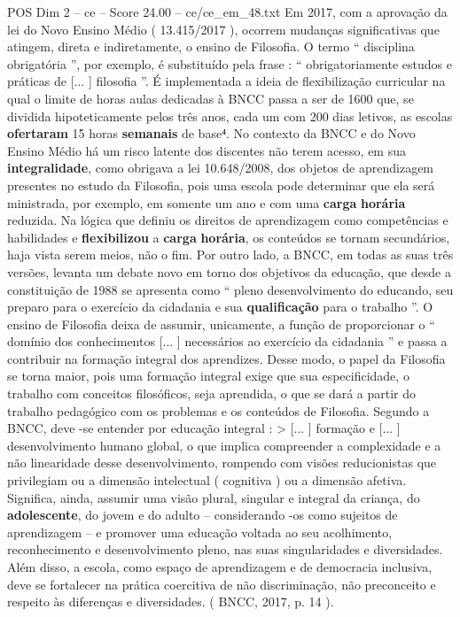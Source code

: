 \begin{textsample}{POS Dim 2 – ce – Score 24.00 – ce/ce\_em\_48.txt}
Em 2017, com a aprovação da lei do Novo Ensino Médio ( 13.415/2017 ), ocorrem mudanças significativas que atingem, direta e indiretamente, o ensino de Filosofia.
O termo “ disciplina obrigatória ”, por exemplo, é substituído pela frase : “ obrigatoriamente estudos e práticas de [... ] filosofia ”.
É implementada a ideia de flexibilização curricular na qual o limite de horas aulas dedicadas à BNCC passa a ser de 1600 que, se dividida hipoteticamente pelos três anos, cada um com 200 dias letivos, as escolas \textbf{ofertaram} 15 horas \textbf{semanais} de base⁴.
No contexto da BNCC e do Novo Ensino Médio há um risco latente dos discentes não terem acesso, em sua \textbf{integralidade}, como obrigava a lei 10.648/2008, dos objetos de aprendizagem presentes no estudo da Filosofia, pois uma escola pode determinar que ela será ministrada, por exemplo, em somente um ano e com uma \textbf{carga} \textbf{horária} reduzida.
Na lógica que definiu os direitos de aprendizagem como competências e habilidades e \textbf{flexibilizou} a \textbf{carga} \textbf{horária}, os conteúdos se tornam secundários, haja vista serem meios, não o fim.
Por outro lado, a BNCC, em todas as suas três versões, levanta um debate novo em torno dos objetivos da educação, que desde a constituição de 1988 se apresenta como “ pleno desenvolvimento do educando, seu preparo para o exercício da cidadania e sua \textbf{qualificação} para o trabalho ”.
O ensino de Filosofia deixa de assumir, unicamente, a função de proporcionar o “ domínio dos conhecimentos [... ] necessários ao exercício da cidadania ” e passa a contribuir na formação integral dos aprendizes.
Desse modo, o papel da Filosofia se torna maior, pois uma formação integral exige que sua especificidade, o trabalho com conceitos filosóficos, seja aprendida, o que se dará a partir do trabalho pedagógico com os problemas e os conteúdos de Filosofia.
Segundo a BNCC, deve -se entender por educação integral : > [... ] formação e [... ] desenvolvimento humano global, o que implica compreender a complexidade e a não linearidade desse desenvolvimento, rompendo com visões reducionistas que privilegiam ou a dimensão intelectual ( cognitiva ) ou a dimensão afetiva.
Significa, ainda, assumir uma visão plural, singular e integral da criança, do \textbf{adolescente}, do jovem e do adulto – considerando -os como sujeitos de aprendizagem – e promover uma educação voltada ao seu acolhimento, reconhecimento e desenvolvimento pleno, nas suas singularidades e diversidades.
Além disso, a escola, como espaço de aprendizagem e de democracia inclusiva, deve se fortalecer na prática coercitiva de não discriminação, não preconceito e respeito às diferenças e diversidades. ( BNCC, 2017, p. 14 ).

\end{textsample}

